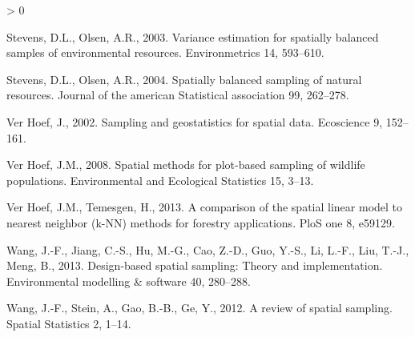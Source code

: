 \documentclass[]{elsarticle} %
\newlength{\cslhangindent}
\newenvironment{CSLReferences}[2] %
 {%
  \setlength{\parindent}{0pt}
  \ifodd #1 \everypar{\setlength{\hangindent}{\cslhangindent}}\ignorespaces\fi
  \ifnum #2 > 0
  \setlength{\parskip}{#2\baselineskip}
  \fi
 }%
 {}
\begin{document}
\begin{CSLReferences}{1}{0}
\leavevmode\hypertarget{ref-stevens2003variance}{}%
Stevens, D.L., Olsen, A.R., 2003. Variance estimation for spatially
balanced samples of environmental resources. Environmetrics 14,
593--610.

\leavevmode\hypertarget{ref-stevens2004spatially}{}%
Stevens, D.L., Olsen, A.R., 2004. Spatially balanced sampling of natural
resources. Journal of the american Statistical association 99, 262--278.

\leavevmode\hypertarget{ref-verhoef2002sampling}{}%
Ver Hoef, J., 2002. Sampling and geostatistics for spatial data.
Ecoscience 9, 152--161.

\leavevmode\hypertarget{ref-verhoef2008spatial}{}%
Ver Hoef, J.M., 2008. Spatial methods for plot-based sampling of
wildlife populations. Environmental and Ecological Statistics 15, 3--13.

\leavevmode\hypertarget{ref-ver2013comparison}{}%
Ver Hoef, J.M., Temesgen, H., 2013. A comparison of the spatial linear
model to nearest neighbor (k-NN) methods for forestry applications. PloS
one 8, e59129.

\leavevmode\hypertarget{ref-wang2013design}{}%
Wang, J.-F., Jiang, C.-S., Hu, M.-G., Cao, Z.-D., Guo, Y.-S., Li, L.-F.,
Liu, T.-J., Meng, B., 2013. Design-based spatial sampling: Theory and
implementation. Environmental modelling \& software 40, 280--288.

\leavevmode\hypertarget{ref-wang2012review}{}%
Wang, J.-F., Stein, A., Gao, B.-B., Ge, Y., 2012. A review of spatial
sampling. Spatial Statistics 2, 1--14.

\end{CSLReferences}
\end{document}
